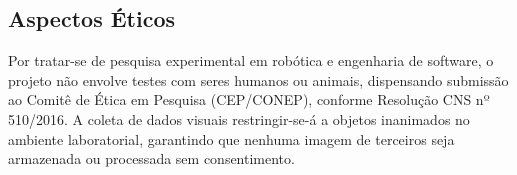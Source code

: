 \subsection*{Aspectos Éticos}
Por tratar-se de pesquisa experimental em robótica e engenharia de software, o projeto não envolve testes com seres humanos ou animais, dispensando submissão ao Comitê de Ética em Pesquisa (CEP/CONEP), conforme Resolução CNS nº 510/2016. A coleta de dados visuais restringir-se-á a objetos inanimados no ambiente laboratorial, garantindo que nenhuma imagem de terceiros seja armazenada ou processada sem consentimento.